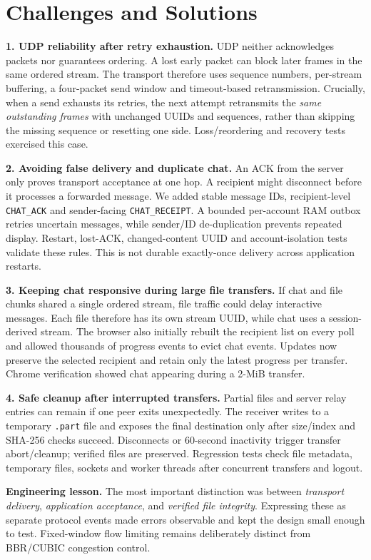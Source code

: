 \clearpage
\section{Challenges and Solutions}

\noindent\textbf{1. UDP reliability after retry exhaustion.}\quad
UDP neither acknowledges packets nor guarantees ordering. A lost early packet can block later frames in the same ordered stream. The transport therefore uses sequence numbers, per-stream buffering, a four-packet send window and timeout-based retransmission. Crucially, when a send exhausts its retries, the next attempt retransmits the \emph{same outstanding frames} with unchanged UUIDs and sequences, rather than skipping the missing sequence or resetting one side. Loss/reordering and recovery tests exercised this case.

\medskip\noindent\textbf{2. Avoiding false delivery and duplicate chat.}\quad
An ACK from the server only proves transport acceptance at one hop. A recipient might disconnect before it processes a forwarded message. We added stable message IDs, recipient-level \texttt{CHAT\_ACK} and sender-facing \texttt{CHAT\_RECEIPT}. A bounded per-account RAM outbox retries uncertain messages, while sender/ID de-duplication prevents repeated display. Restart, lost-ACK, changed-content UUID and account-isolation tests validate these rules. This is not durable exactly-once delivery across application restarts.

\medskip\noindent\textbf{3. Keeping chat responsive during large file transfers.}\quad
If chat and file chunks shared a single ordered stream, file traffic could delay interactive messages. Each file therefore has its own stream UUID, while chat uses a session-derived stream. The browser also initially rebuilt the recipient list on every poll and allowed thousands of progress events to evict chat events. Updates now preserve the selected recipient and retain only the latest progress per transfer. Chrome verification showed chat appearing during a 2-MiB transfer.

\medskip\noindent\textbf{4. Safe cleanup after interrupted transfers.}\quad
Partial files and server relay entries can remain if one peer exits unexpectedly. The receiver writes to a temporary \texttt{.part} file and exposes the final destination only after size/index and SHA-256 checks succeed. Disconnects or 60-second inactivity trigger transfer abort/cleanup; verified files are preserved. Regression tests check file metadata, temporary files, sockets and worker threads after concurrent transfers and logout.

\medskip\noindent\textbf{Engineering lesson.}\quad
The most important distinction was between \emph{transport delivery}, \emph{application acceptance}, and \emph{verified file integrity}. Expressing these as separate protocol events made errors observable and kept the design small enough to test. Fixed-window flow limiting remains deliberately distinct from BBR/CUBIC congestion control.
\clearpage
